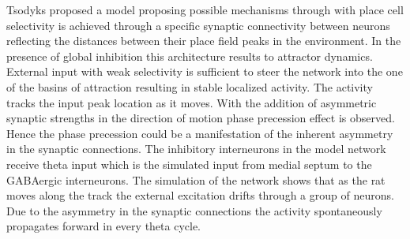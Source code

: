 Tsodyks \cite{Tsodyks1996} proposed a model proposing possible mechanisms through with place cell selectivity is achieved through a specific synaptic connectivity between neurons reflecting the distances between their place field peaks in the environment. In the presence of global inhibition this architecture results to attractor dynamics. External input with weak selectivity is sufficient to steer the network into the one of the basins of attraction resulting in stable localized activity. The activity tracks the input peak location as it moves. With the addition of asymmetric synaptic strengths in the direction of motion phase precession effect is observed. Hence the phase precession could be a manifestation of the inherent asymmetry in the synaptic connections. The inhibitory interneurons in the model network receive theta input which is the simulated input from medial septum to the GABAergic interneurons. The simulation of the network shows that as the rat moves along the track the external excitation drifts through a group of neurons. Due to the asymmetry in the synaptic connections the activity spontaneously propagates forward in every theta cycle. \\  

